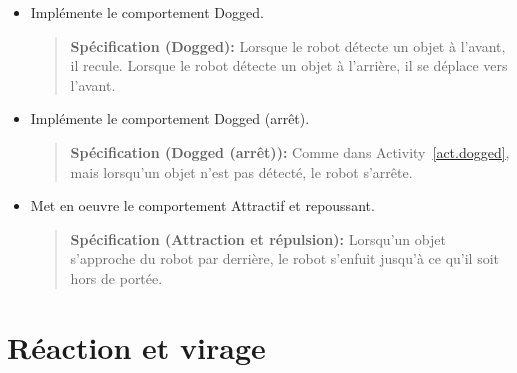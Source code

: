{\begin{framed}
\begin{itemize}
\item Implémente le comportement Dogged.
\begin{quote}
\normalsize\noindent\textbf{Spécification (Dogged):} Lorsque le robot détecte un objet à l'avant, il recule. Lorsque le robot détecte un objet à l'arrière, il se déplace vers l'avant.
\end{quote}
\end{itemize}
\end{framed}

\begin{framed}
\begin{itemize}
\item Implémente le comportement Dogged (arrêt).
\begin{quote}
\normalsize\noindent\textbf{Spécification (Dogged (arrêt)):} Comme dans Activity~\ref{act.dogged}, mais lorsqu'un objet n'est pas détecté, le robot s'arrête.
\end{quote}
\end{itemize}
\end{framed}

\begin{framed}
\begin{itemize}
\item Met en oeuvre le comportement Attractif et repoussant.
\begin{quote}
\normalsize\noindent\textbf{Spécification (Attraction et répulsion):} Lorsqu'un objet s'approche du robot par derrière, le robot s'enfuit jusqu'à ce qu'il soit hors de portée.
\end{quote}
\end{itemize}
\end{framed}


\section{Réaction et virage}\label{s.turning}

}
